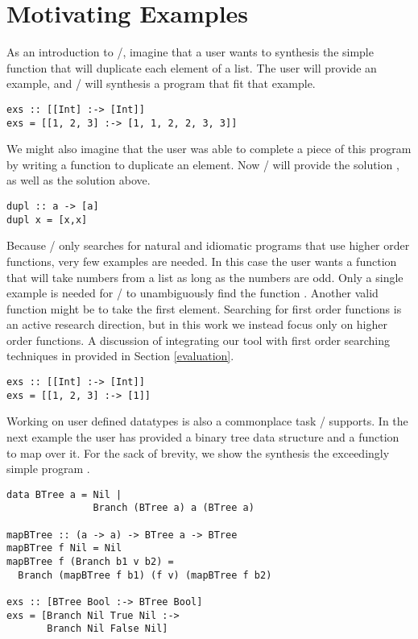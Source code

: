 \section{Motivating Examples} 
\label{examples}


As an introduction to \ourTool/, imagine that a user wants to synthesis the simple  function that will duplicate each element of a list.
The user will provide an example, and \ourTool/ will synthesis a program  that fit that example.

\begin{lstlisting}
exs :: [[Int] :-> [Int]]
exs = [[1, 2, 3] :-> [1, 1, 2, 2, 3, 3]]
\end{lstlisting}

We might also imagine that the user was able to complete a piece of this program by writing a function  to duplicate an element. Now \ourTool/ will provide the solution , as well as the solution above.

\begin{lstlisting}
dupl :: a -> [a]
dupl x = [x,x]
\end{lstlisting}

Because \ourTool/ only searches for natural and idiomatic programs that use higher order functions, very few examples are needed. In this case the user wants a function that will take numbers from a list as long as the numbers are odd. Only a single example is needed for \ourTool/ to unambiguously find the function . Another valid function might be  to take the first element. Searching for first order functions is an active research direction, but in this work we instead focus only on higher order functions. A discussion of integrating our tool with first order searching techniques in provided in Section \ref{evaluation}.

\begin{lstlisting}
exs :: [[Int] :-> [Int]]
exs = [[1, 2, 3] :-> [1]]
\end{lstlisting}

Working on user defined datatypes is also a commonplace task \ourTool/ supports. In the next example the user has provided a binary tree data structure and a function to map over it. For the sack of brevity, we show the synthesis the exceedingly simple program .

\begin{lstlisting}
data BTree a = Nil |
               Branch (BTree a) a (BTree a)

mapBTree :: (a -> a) -> BTree a -> BTree 
mapBTree f Nil = Nil
mapBTree f (Branch b1 v b2) = 
  Branch (mapBTree f b1) (f v) (mapBTree f b2)

exs :: [BTree Bool :-> BTree Bool]
exs = [Branch Nil True Nil :->
       Branch Nil False Nil]
\end{lstlisting}

